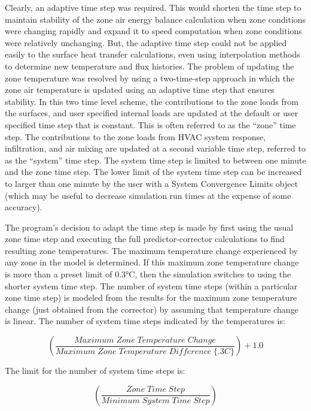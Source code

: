 Clearly, an adaptive time step was required. This would shorten the time step to maintain stability of the zone air energy balance calculation when zone conditions were changing rapidly and expand it to speed computation when zone conditions were relatively unchanging. But, the adaptive time step could not be applied easily to the surface heat transfer calculations, even using interpolation methods to determine new temperature and flux histories. The problem of updating the zone temperature was resolved by using a two-time-step approach in which the zone air temperature is updated using an adaptive time step that ensures stability. In this two time level scheme, the contributions to the zone loads from the surfaces, and user specified internal loads are updated at the default or user specified time step that is constant. This is often referred to as the ``zone'' time step. The contributions to the zone loads from HVAC system response, infiltration, and air mixing are updated at a second variable time step, referred to as the ``system'' time step. The system time step is limited to between one minute and the zone time step. The lower limit of the system time step can be increased to larger than one minute by the user with a System Convergence Limits object (which may be useful to decrease simulation run times at the expense of some accuracy).

The program's decision to adapt the time step is made by first using the usual zone time step and executing the full predictor-corrector calculations to find resulting zone temperatures. The maximum temperature change experienced by any zone in the model is determined. If this maximum zone temperature change is more than a preset limit of 0.3°C, then the simulation switches to using the shorter system time step. The number of system time steps (within a particular zone time step) is modeled from the results for the maximum zone temperature change (just obtained from the corrector) by assuming that temperature change is linear. The number of system time steps indicated by the temperatures is:

\begin{equation}
\left( {\frac{{Maximum \;Zone\;Temperature\;Change}}{{Maximum\;Zone\;Temperature\;Difference\;\{ .3C\} }}} \right) + 1.0
\end{equation}

The limit for the number of system time steps is:

\begin{equation}
\left( {\frac{{Zone\;Time\;Step}}{{Minimum\;System\;Time\;Step}}} \right)
\end{equation}

